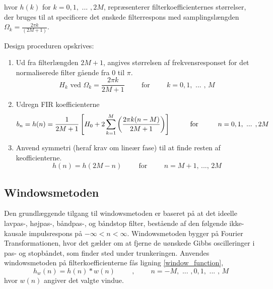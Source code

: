 hvor $h(k)$ for $k=0,1,\text{ ... },2M$, repræsenterer filterkoefficienternes størrelser, der bruges til at specificere det ønskede filterrespons med samplingslængden $\Omega_{k}=\frac{2\pi k}{(2M+1)}$.

Design proceduren opskrives:


\begin{enumerate}
\item Ud fra filterlængden $2M+1$, angives størrelsen af frekvensresponset for det normaliserede filter gående fra $0$ til $\pi$.
\begin{equation}
	H_k \text{ ved } \Omega_{k} = \frac{2 \pi k}{2M+1} \hspace{1cm} \text{for} \hspace{1cm} k=0,1,\text{ ... , } M
\end{equation}
\item Udregn FIR koefficienterne
\begin{equation}
b_n = h(n)=\frac{1}{2M+1}\left[ H_{0}+2\sum_{k=1}^{M} \left( \frac{2\pi k(n-M)}{2M+1} \right) \right] \hspace{1cm} \text{for} \hspace{1 cm} n=0,1,\text{ ... },2M
\end{equation}
\item Anvend symmetri (heraf krav om lineær fase) til at finde resten af keofficienterne.
\begin{equation}
	h(n) = h(2M-n) \hspace{1cm} \text{for} \hspace{1cm} n=M+1 \text{, ..., } 2M
\end{equation}
\end{enumerate}

\subsection{Windowsmetoden}
Den grundlæggende tilgang til windowsmetoden er baseret på at det ideelle lavpas-, højpas-, båndpas-, og båndstop filter, bestående af den følgende ikke-kausale impulsrespons på $-\infty < n < \infty$. Windowsmetoden bygger på Fourier Transformationen, hvor det gælder om at fjerne de uønskede Gibbs oscilleringer i pas- og stopbåndet, som finder sted under trunkeringen. Anvendes windowsmetoden på filterkoefficienterne fås ligning \ref{window_function},
\begin{equation}
	h_w(n) = h(n)*w(n) \hspace{1cm}\text{,} \hspace{1cm}n=-M,\text{ ... },0, 1,\text{ ... , }M	
	\label{window_function}
\end{equation}
hvor $w(n)$ angiver det valgte vindue.

